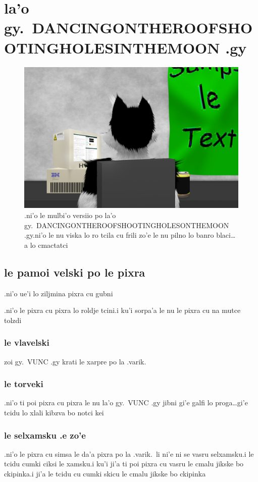\documentclass{report}
\begin{document}
\chapter{la'o gy.\ DANCINGONTHEROOFSHOOTINGHOLESINTHEMOON .gy}
\begin{figure}[ht]
	\centering
	\includegraphics[width=\textwidth]{dancingontheroofshootingholesinthemoon/dancingontheroofshootingholesinthemoon.png}
	\caption[center]{.ni'o le mulbi'o versiio po la'o gy.\ DANCINGONTHEROOFSHOOTINGHOLESONTHEMOON .gy\@  .ni'o le nu viska lo ro tcila cu frili zo'e le nu pilno lo banro blaci\ldots a lo cmactatci}
\end{figure}
\section{le pamoi velski po le pixra}
.ni'o ue'i lo ziljmina pixra cu gubni

.ni'o le pixra cu pixra lo roldje tcini\@  .i ku'i sorpa'a le nu le pixra cu na mutce tolzdi

\subsection{le vlavelski}
zoi gy.\ VUNC .gy krati le xarpre po la .varik.
\subsection{le torveki}
.ni'o ti poi pixra cu pixra le nu la'o gy.\ VUNC .gy jibni gi'e galfi lo proga\ldots gi'e tcidu lo xlali kibzva bo notci kei

\subsection{le selxamsku .e zo'e}
.ni'o le pixra cu simsa le da'a pixra po la .varik.\ li ni'e ni se vasru selxamsku\@  .i le tcidu cumki ciksi le xamsku\@  .i ku'i ji'a ti poi pixra cu vasru le cmalu jikske bo ckipinka\@  .i ji'a le tcidu cu cumki skicu le cmalu jikske bo ckipinka
\end{document}
